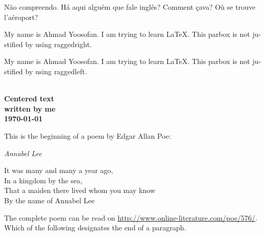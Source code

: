 \documentclass{article}
\begin{document}
\begin{latin}
Não compreendo. Há aqui alguém que fale inglês?
Comment çava? Où se trouve l'aéroport? \\
\quad\parbox{2cm}{\raggedright
My name is Ahmad Yoosofan. I am trying to learn \LaTeX.  This parbox is not justified by using raggedright.
}
\quad\parbox{2cm}{\raggedleft
My name is Ahmad Yoosofan. I am trying to learn \LaTeX.  This parbox is not justified by using raggedleft.
}  \\
{\centering
\huge\bfseries Centered text \\
\Large\normalfont written by me \\
\normalsize\today
}
\par \noindent This is the beginning of a poem
by Edgar Allan Poe:
\begin{center}
\emph{Annabel Lee}
\end{center}
\begin{center}
It was many and many a year ago,\\
In a kingdom by the sea,\\
That a maiden there lived whom you may know\\
By the name of Annabel Lee
\end{center}
The complete poem can be read on
\url{http://www.online-literature.com/poe/576/}.\\
Which of the following designates the end of a paragraph.
\end{latin}
\end{document}
